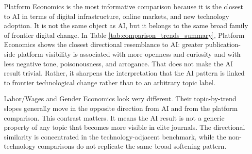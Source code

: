 \documentclass[11pt]{article}
\begin{document}
Platform Economics is the most informative comparison because it is the closest to AI in terms of digital infrastructure, online markets, and new technology adoption. It is not the same object as AI, but it belongs to the same broad family of frontier digital change. In Table \ref{tab:comparison_trends_summary}, Platform Economics shows the closest directional resemblance to AI: greater publication-side platform visibility is associated with more openness and curiosity and with less negative tone, poisonousness, and arrogance. That does not make the AI result trivial. Rather, it sharpens the interpretation that the AI pattern is linked to frontier technological change rather than to an arbitrary topic label.

Labor/Wages and Gender Economics look very different. Their topic-by-trend slopes generally move in the opposite direction from AI and from the platform comparison. This contrast matters. It means the AI result is not a generic property of any topic that becomes more visible in elite journals. The directional similarity is concentrated in the technology-adjacent benchmark, while the non-technology comparisons do not replicate the same broad softening pattern.

\begin{table}[!htbp]
    \centering
    \caption{Comparison Trends: Preferred Full DDD Specification}
    \label{tab:comparison_trends_summary}
    \footnotesize
    \setlength{\tabcolsep}{5pt}
    \renewcommand{\arraystretch}{1.0}
    {\captionsetup{justification=raggedright,singlelinecheck=false}
    \caption*{\footnotesize Notes: Significance is based on year-clustered standard errors. * \(p<0.1\), ** \(p<0.05\), *** \(p<0.01\).}}
\end{table}
\end{document}
